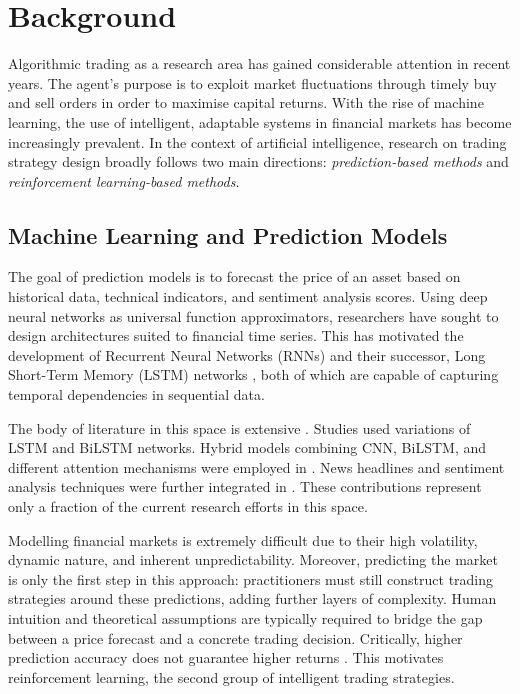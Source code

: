 \documentclass[12pt, a4paper]{report}
\begin{document}
\chapter{Background}
\label{ch:background}

Algorithmic trading as a research area has gained considerable attention in recent years.
The agent's purpose is to exploit market fluctuations through timely buy and sell orders in
order to maximise capital returns. With the rise of machine learning, the use of intelligent,
adaptable systems in financial markets has become increasingly prevalent. In the context of
artificial intelligence, research on trading strategy design broadly follows two main
directions: \emph{prediction-based methods} and \emph{reinforcement learning-based methods}.

\section{Machine Learning and Prediction Models}
\label{sec:pred-models}


The goal of prediction models is to forecast the price of an asset
based on historical data, technical indicators, and sentiment analysis scores.
Using deep neural networks as universal function approximators, researchers have sought to
design architectures suited to financial time series. This has motivated the development of
Recurrent Neural Networks (RNNs) \cite{rumelhart1986rnn} and their successor, Long Short-Term
Memory (LSTM) networks \cite{hochreiter1997lstm}, both of which are capable of capturing temporal
dependencies in sequential data.


The body of literature in this space is extensive \cite{huang2024novel}.
Studies \cite{zhang2021forecasting,qiao2022prediction,md2022novel}
used variations of LSTM and BiLSTM networks.
Hybrid models combining CNN, BiLSTM, and different attention mechanisms were employed in
\cite{lu2020cnn,huang2021financial,shi2023integrated}.
News headlines and sentiment analysis techniques were further integrated in
\cite{sridhar2021news}. These contributions represent only a fraction of the current research
efforts in this space.


Modelling financial markets is extremely difficult due to their high volatility, dynamic
nature, and inherent unpredictability. Moreover, predicting the market is only the first step
in this approach: practitioners must still construct trading strategies around these
predictions, adding further layers of complexity. Human intuition and theoretical assumptions
are typically required to bridge the gap between a price forecast and a concrete trading
decision. Critically, higher prediction accuracy does not guarantee higher returns
\cite{huang2024novel}. This motivates reinforcement learning, the second group of intelligent trading strategies.
\end{document}
